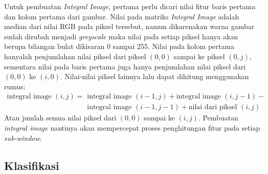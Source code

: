 Untuk pembuatan \emph{Integral Image}, pertama perlu dicari nilai fitur 
baris pertama dan kolom pertama dari gambar. Nilai pada matriks \emph{Integral Image} 
adalah median dari nilai RGB pada piksel tersebut, namun dikarenakan warna 
gambar sudah dirubah menjadi \emph{greyscale} maka nilai pada setiap piksel 
hanya akan berupa bilangan bulat dikisaran 0 sampai 255. Nilai pada kolom 
pertama hanyalah penjumlahan nilai piksel dari piksel $(0, 0)$ sampai ke piksel 
$(0, j)$, sementara nilai pada baris pertama juga hanya penjumlahan nilai 
piksel dari $(0, 0)$ ke  $(i, 0)$. Nilai-nilai piksel lainnya lalu dapat 
dihitung menggunakan rumus: 
\begin{equation}
  \begin{split}
    \text{integral image } (i,j) = {} & \text{integral image } (i-1,j) + \text{integral image } (i,j-1) - \\
    & \text{integral image } (i-1,j-1) + \text{nilai dari piksel } (i,j)
  \end{split}
\end{equation}
Atau jumlah semua nilai piksel dari $(0, 0)$ sampai ke $(i, j)$.
Pembuatan \emph{integral image} nantinya akan mempercepat proses penghitungan 
fitur pada setiap \emph{sub-window}.


\subsection{Klasifikasi}


